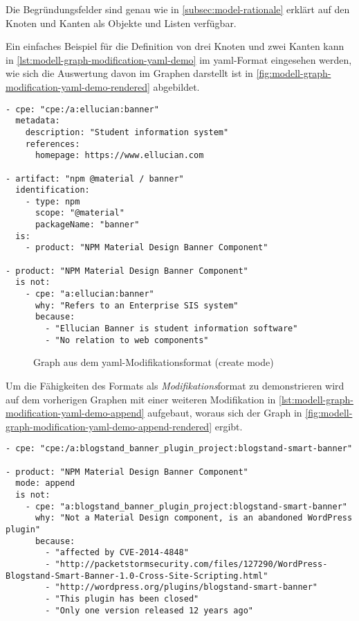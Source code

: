 Die Begründungsfelder sind genau wie in \autoref{subsec:model-rationale} erklärt auf den Knoten und Kanten als Objekte und Listen verfügbar.

Ein einfaches Beispiel für die Definition von drei Knoten und zwei Kanten kann in \autoref{lst:modell-graph-modification-yaml-demo} im \acrshort{yaml}-Format eingesehen werden, wie sich die Auswertung davon im Graphen darstellt ist in \autoref{fig:modell-graph-modification-yaml-demo-rendered} abgebildet.

\begin{lstlisting}[style=yaml,caption={\acrshort{yaml}-Modifikationsformat (create mode)},label={lst:modell-graph-modification-yaml-demo},basicstyle=\ttfamily\scriptsize]
- cpe: "cpe:/a:ellucian:banner"
  metadata:
    description: "Student information system"
    references:
      homepage: https://www.ellucian.com

- artifact: "npm @material / banner"
  identification:
    - type: npm
      scope: "@material"
      packageName: "banner"
  is:
    - product: "NPM Material Design Banner Component"

- product: "NPM Material Design Banner Component"
  is not:
    - cpe: "a:ellucian:banner"
      why: "Refers to an Enterprise SIS system"
      because:
        - "Ellucian Banner is student information software"
        - "No relation to web components"
\end{lstlisting}

\begin{figure}[htbp]
    \centering
    \makebox[\textwidth]{}
    \caption{Graph aus dem \acrshort{yaml}-Modifikationsformat (create mode)}
    \label{fig:modell-graph-modification-yaml-demo-rendered}
\end{figure}

Um die Fähigkeiten des Formats als \textit{Modifikations}format zu demonstrieren wird auf dem vorherigen Graphen mit einer weiteren Modifikation in \autoref{lst:modell-graph-modification-yaml-demo-append} aufgebaut, woraus sich der Graph in \autoref{fig:modell-graph-modification-yaml-demo-append-rendered} ergibt.

\begin{lstlisting}[style=yaml,caption={\acrshort{yaml}-Modifikationsformat (append mode)},label={lst:modell-graph-modification-yaml-demo-append},basicstyle=\ttfamily\scriptsize]
- cpe: "cpe:/a:blogstand_banner_plugin_project:blogstand-smart-banner"

- product: "NPM Material Design Banner Component"
  mode: append
  is not:
    - cpe: "a:blogstand_banner_plugin_project:blogstand-smart-banner"
      why: "Not a Material Design component, is an abandoned WordPress plugin"
      because:
        - "affected by CVE-2014-4848"
        - "http://packetstormsecurity.com/files/127290/WordPress-Blogstand-Smart-Banner-1.0-Cross-Site-Scripting.html"
        - "http://wordpress.org/plugins/blogstand-smart-banner"
        - "This plugin has been closed"
        - "Only one version released 12 years ago"
\end{lstlisting}

